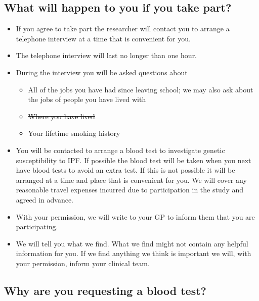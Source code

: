 \documentclass[a4paper,10pt]{article}
\providecommand{\DIFdeltex}[1]{{\protect\color{red}\sout{#1}}}                      %
\providecommand{\DIFdelbegin}{} %
\providecommand{\DIFdelend}{} %
\providecommand{\DIFdel}[1]{\texorpdfstring{\DIFdeltex{#1}}{}} %
\begin{document}
\subsection*{What will happen to you if you take part?}
 \begin{itemize} 
 \item If you agree to take part the researcher will contact you to arrange a telephone interview at a time that is convenient for you.
 \item The telephone interview will last no longer than one hour.
 \item During the interview you will be asked questions about  \begin{itemize} 
                                                                \item All of the jobs you have had since leaving school; we may also ask about the jobs of people you have lived with
                                                                \item \DIFdelbegin \DIFdel{Where you have lived 
                                                                }%
\item%
\DIFdelend Your lifetime smoking history
                                                                \end{itemize} 
\item You will be contacted to arrange a blood test to investigate genetic susceptibility to IPF\@. If possible the blood test will be taken when you next have blood tests to avoid an extra test. If this is
not possible it will be arranged at a time and place that is convenient for you. We will cover any reasonable travel expenses incurred due to participation in the study and agreed in advance.
\item With your permission, we will write to your GP to inform them that you are participating.
\item We will tell you what we find. What we find might not contain any helpful information for you. If we find anything we think is important we will, with your permission, inform your clinical team.
 \end{itemize} 

\subsection*{Why are you requesting a blood test?}
\end{document}
